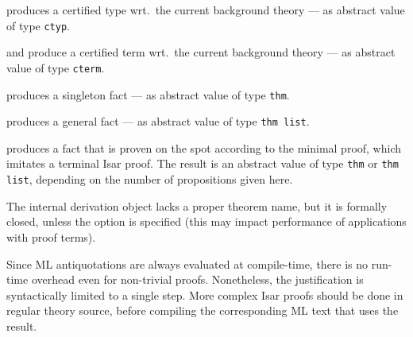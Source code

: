 \begin{isabellebody}
\begin{isamarkuptext}
  \begin{description}

  \item {} produces a certified type wrt.\ the
  current background theory --- as abstract value of type \verb|ctyp|.

  \item {} and  produce a
  certified term wrt.\ the current background theory --- as abstract
  value of type \verb|cterm|.

  \item {} produces a singleton fact --- as abstract
  value of type \verb|thm|.

  \item {} produces a general fact --- as abstract
  value of type \verb|thm list|.

  \item {} produces a fact that is proven on
  the spot according to the minimal proof, which imitates a terminal
  Isar proof.  The result is an abstract value of type \verb|thm|
  or \verb|thm list|, depending on the number of propositions
  given here.

  The internal derivation object lacks a proper theorem name, but it
  is formally closed, unless the  option is specified
  (this may impact performance of applications with proof terms).

  Since ML antiquotations are always evaluated at compile-time, there
  is no run-time overhead even for non-trivial proofs.  Nonetheless,
  the justification is syntactically limited to a single \hyperlink{command.by}{\mbox{}} step.  More complex Isar proofs should be done in regular
  theory source, before compiling the corresponding ML text that uses
  the result.


\end{description}
\end{isamarkuptext}
\end{isabellebody}
